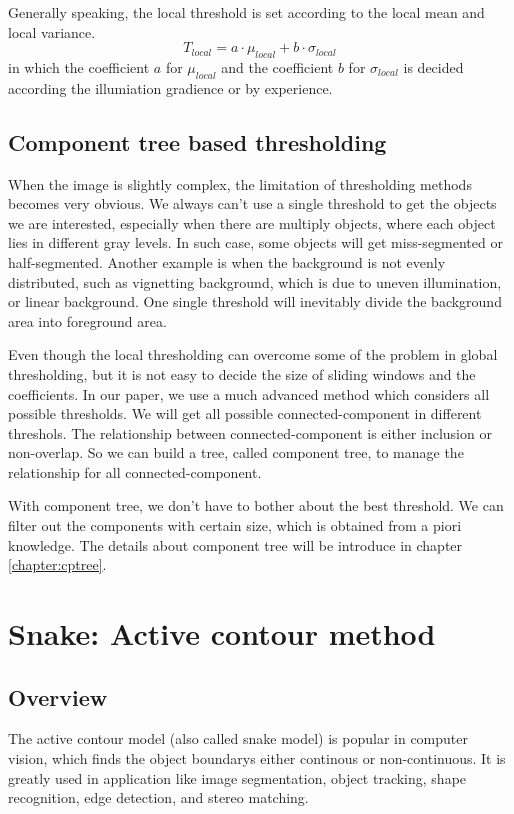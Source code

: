 Generally speaking, the local threshold is set according to the local mean and local variance.
$$
T_{local} = a\cdot\mu_{local} + b\cdot\sigma_{local}
$$
in which the coefficient $a$ for $\mu_{local}$ and the coefficient $b$ for $\sigma_{local}$ is decided according the illumiation gradience or by experience.
\subsection{Component tree based thresholding} \label{sec:thresh-cptree}
When the image is slightly complex, the limitation of thresholding methods becomes very obvious. We always can't use a single threshold to get the objects we are interested, especially when there are multiply objects, where each object lies in different gray levels. In such case, some objects will get miss-segmented or half-segmented. Another example is when the background is not evenly distributed, such as vignetting background, which is due to uneven illumination, or linear background. One single threshold will inevitably divide the background area into foreground area.

Even though the local thresholding can overcome some of the problem in global thresholding, but it is not easy to decide the size of sliding windows and the coefficients. In our paper, we use a much advanced method which considers all possible thresholds. We will get all possible connected-component in different threshols. The relationship between connected-component is either inclusion or non-overlap. So we can build a tree, called component tree, to manage the relationship for all connected-component. 

With component tree, we don't have to bother about the best threshold. We can filter out the components with certain size, which is obtained from a piori knowledge. The details about component tree will be introduce in chapter \ref{chapter:cptree}.
\section{Snake: Active contour method}
\subsection{Overview}
The active contour model\cite{kass1988snakes} (also called snake model) is popular in computer vision, which finds the object boundarys either continous or non-continuous. It is greatly used in application like image segmentation, object tracking, shape recognition, edge detection, and stereo matching.


